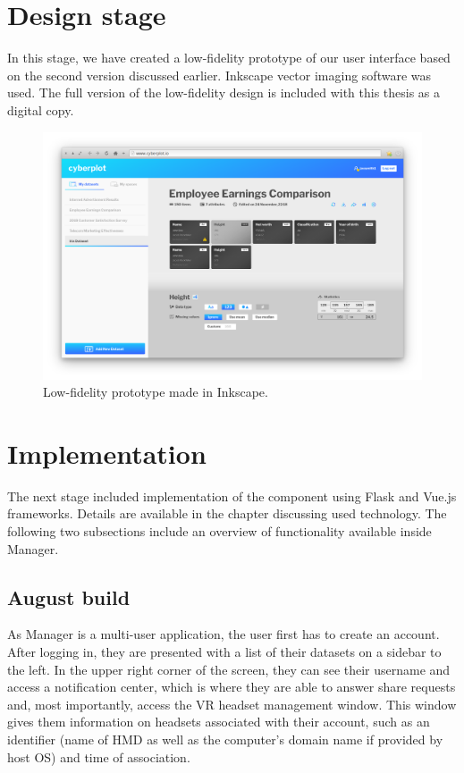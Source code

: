 \documentclass[thesis=M,english,hidelinks]{FITthesisXE}[2012/06/26]
\begin{document}
\section{Design stage}

In this stage, we have created a low-fidelity prototype of our user interface based on the second version discussed earlier. Inkscape vector imaging software was used.\autocite{inkscape} The full version of the low-fidelity design is included with this thesis as a digital copy.

\begin{figure}[ht]
\centering
\includegraphics[scale=0.3]{manager_lofi}
\caption{Low-fidelity prototype made in Inkscape.}
\label{fig:manager_lofi}
\end{figure}

\section{Implementation}

The next stage included implementation of the component using Flask\autocite{flask} and Vue.js\autocite{vuejs} frameworks. Details are available in the chapter discussing used technology. The following two subsections include an overview of functionality available inside Manager.

\subsection{August build}

As Manager is a multi-user application, the user first has to create an account. After logging in, they are presented with a list of their datasets on a sidebar to the left. In the upper right corner of the screen, they can see their username and access a notification center, which is where they are able to answer share requests and, most importantly, access the VR headset management window. This window gives them information on headsets associated with their account, such as an identifier (name of HMD as well as the computer's domain name if provided by host OS) and time of association.
\end{document}
